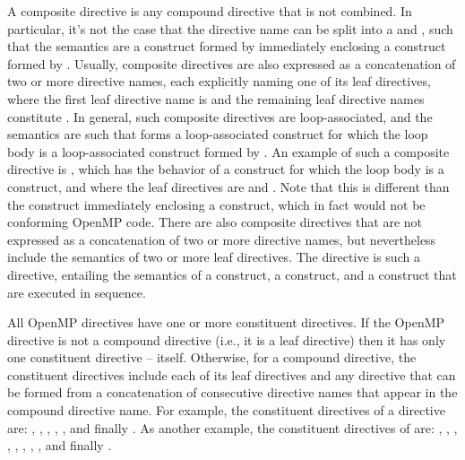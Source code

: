 A composite directive is any compound directive that is not combined. In
particular, it's not the case that the directive name can be split into a
 and , such that the semantics are
a construct formed by  immediately enclosing a construct
formed by . Usually, composite directives are also
expressed as a concatenation of two or more directive names, each explicitly
naming one of its leaf directives, where the first leaf directive name is
 and the remaining leaf directive names constitute
. In general, such composite directives are
loop-associated, and the semantics are such that  forms a
loop-associated construct for which the loop body is a loop-associated
construct formed by . An example of such a composite
directive is , which has the behavior of a
 construct for which the loop body is a 
construct, and where the leaf directives are  and
. Note that this is different than the  construct
immediately enclosing a  construct, which in fact would not be
conforming OpenMP code. There are also composite directives that are not
expressed as a concatenation of two or more directive names, but nevertheless
include the semantics of two or more leaf directives. The 
directive is such a directive, entailing the semantics of a
 construct, a  construct, and a
 construct that are executed in sequence.

All OpenMP directives have one or more constituent directives.
If the OpenMP directive is not a compound directive (i.e., it is a leaf
directive) then it has only one constituent directive -- itself. Otherwise, for
a compound directive, the constituent directives include each of its leaf
directives and any directive that can be formed from a concatenation of
consecutive directive names that appear in the compound directive name. For
example, the constituent directives of a  directive
are: , , , ,
, and finally . As another example,
the constituent directives of  are:
, , ,
, , , , , and finally .


